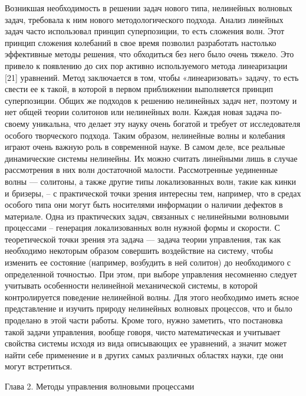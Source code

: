 Возникшая необходимость в решении задач нового типа, нелинейных волновых задач, требовала к ним нового методологического подхода. Анализ линейных задач часто использовал принцип суперпозиции, то есть сложения волн. Этот принцип сложения колебаний в свое время позволил разработать настолько эффективные методы решения, что обходиться без него было очень тяжело. Это привело к появлению до сих пор активно используемого метода линеаризации [21] уравнений. Метод заключается в том, чтобы «линеаризовать» задачу, то есть свести ее к такой, в которой в первом приближении выполняется принцип суперпозиции. Общих же подходов к решению нелинейных задач нет, поэтому и нет общей теории солитонов или нелинейных волн. Каждая новая задача по-своему уникальна, что делает эту науку очень богатой и требует от исследователя особого творческого подхода.
Таким образом, нелинейные волны и колебания играют очень важную роль в современной науке. В самом деле, все реальные динамические системы нелинейны. Их можно считать линейными лишь в случае рассмотрения в них волн достаточной малости. Рассмотренные уединенные волны — солитоны, а также другие типы локализованных волн, такие как кинки и бризеры, – с практической точки зрения интересны тем, например, что в средах особого типа они могут быть носителями информации о наличии дефектов в материале. Одна из практических задач, связанных с нелинейными волновыми процессами – генерация локализованных волн нужной формы и скорости. С теоретической точки зрения эта задача — задача теории управления, так как необходимо некоторым образом совершить воздействие на систему, чтобы изменить ее состояние (например, возбудить в ней солитон) до необходимого с определенной точностью. При этом, при выборе управления несомненно следует учитывать особенности нелинейной механической системы, в которой контролируется поведение нелинейной волны. Для этого необходимо иметь ясное представление и изучить природу нелинейных волновых процессов, что и было проделано в этой части работы. Кроме того, нужно заметить, что постановка такой задачи управления, вообще говоря, чисто математическая и учитывает свойства системы исходя из вида описывающих ее уравнений, а значит может найти себе применение и в других самых различных областях науки, где они могут встретиться.

Глава 2. Методы управления волновыми процессами

